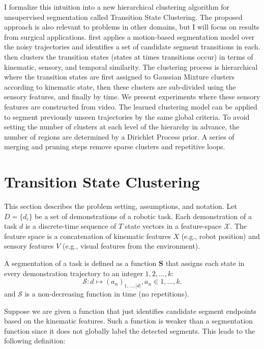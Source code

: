 I formalize this intuition into a new hierarchical clustering algorithm for unsupervised segmentation called Transition State Clustering.
The proposed approach is also relevant to problems in other domains, but I will focus on results from surgical applications.
\tsc first applies a motion-based segmentation model over the noisy trajectories and identifies a set of candidate segment transitions in each.
\tsc then clusters the transition states (states at times transitions occur) in terms of kinematic, sensory, and temporal similarity. 
The clustering process is hierarchical where the transition states are first assigned to Gaussian Mixture clusters according to kinematic state, then these clusters are sub-divided using the sensory features, and finally by time.
We present experiments where these sensory features are constructed from video.
The learned clustering model can be applied to segment previously unseen trajectories by the same global criteria.
To avoid setting the number of clusters at each level of the hierarchy in advance, the number of regions are determined by a Dirichlet Process prior.
A series of merging and pruning steps remove sparse clusters and repetitive loops.


\section{Transition State Clustering}
This section describes the problem setting, assumptions, and notation.
Let $D=\{d_i\}$ be a set of demonstrations of a robotic task.
Each demonstration of a task $d$ is a discrete-time sequence of $T$ state vectors in a feature-space $\mathcal{X}$.
The feature space is a concatenation of kinematic features $X$ (e.g., robot position) and sensory features $V$ (e.g., visual features from the environment).

\begin{definition}[Segmentation]
A segmentation of a task is defined as a function $\mathbf{S}$ that assigns each state in every demonstration trajectory to an integer $1,2,...,k$:
\[
\mathcal{S}: d \mapsto (a_n)_{1,...,|d|}, a_n \in {1,...,k}.
\]
and $\mathcal{S}$ is a non-decreasing function in time (no repetitions).
\end{definition}

Suppose we are given a function that just identifies candidate segment endpoints based on the kinematic features.
Such a function is weaker than a segmentation function since it does not globally label the detected segments.
This leads to the following definition:


